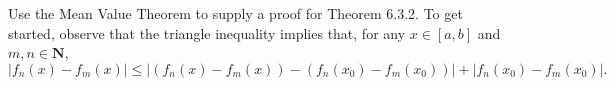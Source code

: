 \begin{exercise}
  Use the Mean Value Theorem to supply a proof for Theorem 6.3.2. To get started, observe that the triangle inequality implies that, for any $x \in[a, b]$ and $m, n \in \mathbf{N}$,
  $$
  \left|f_{n}(x)-f_{m}(x)\right| \leq\left|\left(f_{n}(x)-f_{m}(x)\right)-\left(f_{n}\left(x_{0}\right)-f_{m}\left(x_{0}\right)\right)\right|+\left|f_{n}\left(x_{0}\right)-f_{m}\left(x_{0}\right)\right| .
  $$
\end{exercise}
\begin{solution}
  \TODO
\end{solution}

